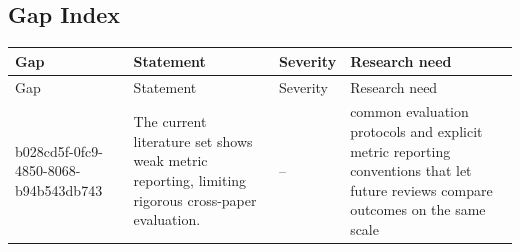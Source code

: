 \documentclass{article}
\begin{document}
\subsection{Gap Index}
\begin{longtable}{p{}p{}p{}p{}}
\toprule
Gap & Statement & Severity & Research need \\
\midrule
\endfirsthead
\toprule
Gap & Statement & Severity & Research need \\
\midrule
\endhead
b028cd5f-0fc9-4850-8068-b94b543db743 & The current literature set shows weak metric reporting, limiting rigorous cross-paper evaluation. & -- & common evaluation protocols and explicit metric reporting conventions that let future reviews compare outcomes on the same scale \\
\bottomrule
\end{longtable}
\end{document}
